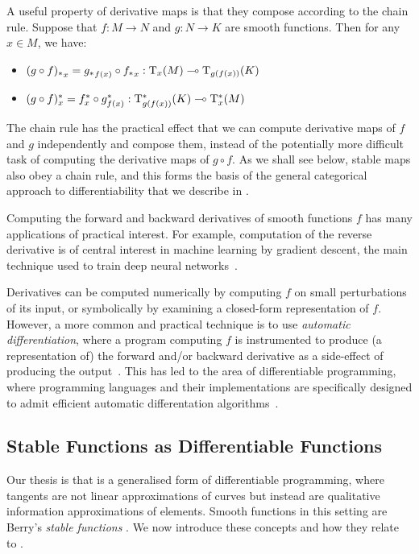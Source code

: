\begin{remark}
  \label{rem:chain-rule}
  A useful property of derivative maps is that they compose according
  to the chain rule. Suppose that $f : M \to N$ and $g : N \to K$ are
  smooth functions. Then for any $x \in M$, we have:
  \begin{itemize}
  \item ${(g \circ f)_{*}}_x = {g_{*}}_{f(x)} \circ {f_{*}}_x : \mathrm{T}_x(M) \multimap \mathrm{T}_{g(f(x))}(K)$
  \item $(g \circ f)^{*}_x = f^{*}_x \circ g^{*}_{f(x)} : \mathrm{T}^*_{g(f(x))}(K) \multimap \mathrm{T}^*_x(M)$
  \end{itemize}
  The chain rule has the practical effect that we can compute
  derivative maps of $f$ and $g$ independently and compose them,
  instead of the potentially more difficult task of computing the
  derivative maps of $g \circ f$. As we shall see below, stable maps
  also obey a chain rule, and this forms the basis of the general
  categorical approach to differentiability that we describe in
  .
\end{remark}

Computing the forward and backward derivatives of smooth functions $f$ has many applications of practical interest. For example, computation of the reverse derivative is of central interest in machine learning by gradient descent, the main technique used to train deep neural networks~\cite{rumelhart88,goodfellow16}.

Derivatives can be computed numerically by computing $f$ on small perturbations of its input, or symbolically by examining a closed-form representation of $f$. However, a more common and practical technique is to use \emph{automatic differentiation}, where a program computing $f$ is instrumented to produce (a representation of) the forward and/or backward derivative as a side-effect of producing the output~\cite{linnainmaa76}. This has led to the area of differentiable programming, where programming languages and their implementations are specifically designed to admit efficient automatic differentation algorithms~\cite{jax2018github,abadi16,elliott17,sigal24}.

\subsection{Stable Functions as Differentiable Functions}

Our thesis is that \GPS is a generalised form of differentiable programming, where tangents are not linear approximations of curves but instead are qualitative information approximations of elements. Smooth functions in this setting are Berry's \emph{stable functions} \cite{berry79,berry82}. We now introduce these concepts and how they relate to \GPS.

